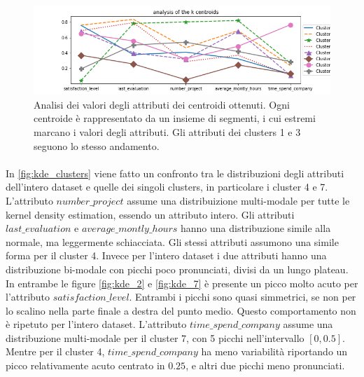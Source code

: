 \documentclass[a4paper]{article}
\begin{document}
\begin{figure}[hbtp]
\centering
\includegraphics[width=0.9\columnwidth]{k-centroids_analysis.png}
\caption{Analisi dei valori degli attributi dei centroidi ottenuti. Ogni centroide è rappresentato da un insieme di segmenti, i cui estremi marcano i valori degli attributi. Gli attributi dei clusters 1 e 3 seguono lo stesso andamento.}
\label{fig:centroids}
\end{figure}

\paragraph{}
In \autoref{fig:kde_clusters} viene fatto un confronto tra le distribuzioni degli attributi dell'intero dataset e quelle dei singoli clusters, in particolare i cluster 4 e 7. L'attributo $number\_project$ assume una distribuizione multi-modale per tutte le kernel density estimation, essendo un attributo intero. Gli attributi $last\_evaluation$ e $average\_montly\_hours$ hanno una distribuzione simile alla normale, ma leggermente schiacciata. Gli stessi attributi assumono una simile forma per il cluster 4. Invece per l'intero dataset i due attributi hanno una distribuzione bi-modale con picchi poco pronunciati, divisi da un lungo plateau. In entrambe le figure \autoref{fig:kde_2} e \autoref{fig:kde_7} è presente un picco molto acuto per l'attributo $satisfaction\_level$. Entrambi i picchi sono quasi simmetrici, se non per lo scalino nella parte finale a destra del punto medio. Questo comportamento non è ripetuto per l'intero dataset. L'attributo $time\_spend\_company$ assume una distribuzione multi-modale per il cluster 7, con 5 picchi nell'intervallo $\left[0, 0.5\right]$. 
Mentre per il cluster 4, 
$time\_spend\_company$ ha meno variabilità riportando un picco relativamente acuto centrato in $0.25$, e altri due picchi meno pronunciati.
\end{document}
